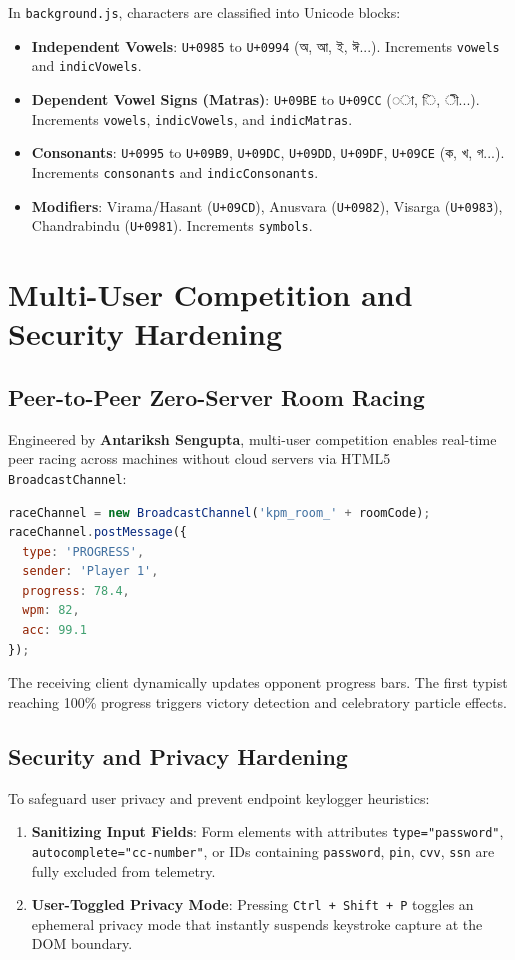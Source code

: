 \documentclass[11pt,a4paper]{article}
\begin{document}
In \texttt{background.js}, characters are classified into Unicode blocks:
\begin{itemize}[leftmargin=*]
  \item \textbf{Independent Vowels}: \texttt{U+0985} to \texttt{U+0994} (অ, আ, ই, ঈ...). Increments \texttt{vowels} and \texttt{indicVowels}.
  \item \textbf{Dependent Vowel Signs (Matras)}: \texttt{U+09BE} to \texttt{U+09CC} (◌া, ◌ি, ◌ী...). Increments \texttt{vowels}, \texttt{indicVowels}, and \texttt{indicMatras}.
  \item \textbf{Consonants}: \texttt{U+0995} to \texttt{U+09B9}, \texttt{U+09DC}, \texttt{U+09DD}, \texttt{U+09DF}, \texttt{U+09CE} (ক, খ, গ...). Increments \texttt{consonants} and \texttt{indicConsonants}.
  \item \textbf{Modifiers}: Virama/Hasant (\texttt{U+09CD}), Anusvara (\texttt{U+0982}), Visarga (\texttt{U+0983}), Chandrabindu (\texttt{U+0981}). Increments \texttt{symbols}.
\end{itemize}

\section{Multi-User Competition and Security Hardening}

\subsection{Peer-to-Peer Zero-Server Room Racing}
Engineered by \textbf{Antariksh Sengupta}, multi-user competition enables real-time peer racing across machines without cloud servers via HTML5 \texttt{BroadcastChannel}:
\begin{lstlisting}[language=JavaScript]
raceChannel = new BroadcastChannel('kpm_room_' + roomCode);
raceChannel.postMessage({
  type: 'PROGRESS',
  sender: 'Player 1',
  progress: 78.4,
  wpm: 82,
  acc: 99.1
});
\end{lstlisting}
The receiving client dynamically updates opponent progress bars. The first typist reaching 100\% progress triggers victory detection and celebratory particle effects.

\subsection{Security and Privacy Hardening}
To safeguard user privacy and prevent endpoint keylogger heuristics:
\begin{enumerate}
  \item \textbf{Sanitizing Input Fields}: Form elements with attributes \texttt{type="password"}, \texttt{autocomplete="cc-number"}, or IDs containing \texttt{password}, \texttt{pin}, \texttt{cvv}, \texttt{ssn} are fully excluded from telemetry.
  \item \textbf{User-Toggled Privacy Mode}: Pressing \texttt{Ctrl + Shift + P} toggles an ephemeral privacy mode that instantly suspends keystroke capture at the DOM boundary.
\end{enumerate}
\end{document}
